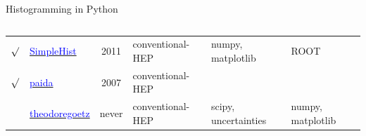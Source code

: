 \documentclass[aspectratio=169]{beamer}
\begin{document}
\begin{frame}{Histogramming in Python}
\begin{columns}
\begin{tabular}{c l c p{2.7 cm} p{1.5 cm} p{4.75 cm}}
$\surd$ & \href{https://pypi.python.org/pypi/SimpleHist}{\textcolor{blue}{SimpleHist}} & 2011 & conventional-HEP & numpy, matplotlib & ROOT \\
$\surd$ & \href{https://pypi.org/project/paida}{\textcolor{blue}{paida}} & 2007 & conventional-HEP & & \\
& \href{https://github.com/theodoregoetz/histogram}{\textcolor{blue}{theodoregoetz}} & never & conventional-HEP & scipy, \mbox{uncertainties} & numpy, matplotlib \\
\end{tabular}
\end{columns}
\end{frame}




\end{document}
